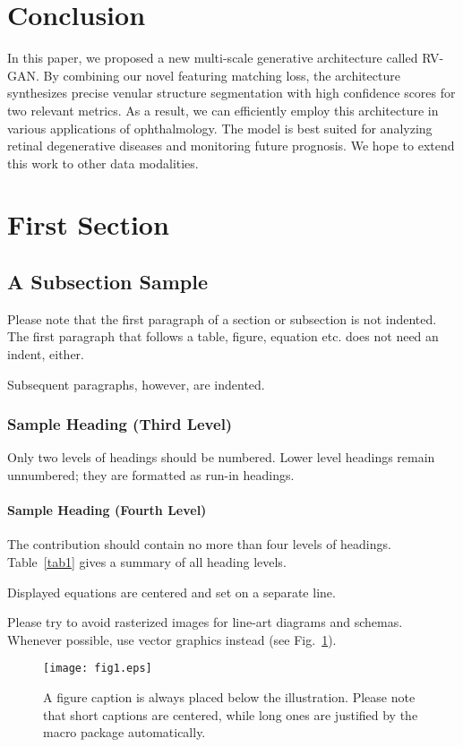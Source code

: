 \documentclass[runningheads]{llncs}
\begin{document}
\section{Conclusion}
In this paper,  we proposed a  new multi-scale generative architecture called RV-GAN. By combining our novel featuring matching loss, the architecture synthesizes precise venular structure segmentation with high confidence scores for two relevant metrics.  As a result,  we can efficiently employ this architecture in various applications of ophthalmology. The model is best suited for analyzing retinal degenerative diseases and monitoring future prognosis. We hope to extend this work to other data modalities.

\iffalse
\section{First Section}
\subsection{A Subsection Sample}
Please note that the first paragraph of a section or subsection is
not indented. The first paragraph that follows a table, figure,
equation etc. does not need an indent, either.

Subsequent paragraphs, however, are indented.

\subsubsection{Sample Heading (Third Level)} Only two levels of
headings should be numbered. Lower level headings remain unnumbered;
they are formatted as run-in headings.

\paragraph{Sample Heading (Fourth Level)}
The contribution should contain no more than four levels of
headings. Table~\ref{tab1} gives a summary of all heading levels.



\noindent Displayed equations are centered and set on a separate
line.

Please try to avoid rasterized images for line-art diagrams and
schemas. Whenever possible, use vector graphics instead (see
Fig.~\ref{fig1}).

\begin{figure}
\texttt{[image: fig1.eps]}
\caption{A figure caption is always placed below the illustration.
Please note that short captions are centered, while long ones are
justified by the macro package automatically.} \label{fig1}
\end{figure}
\end{document}

